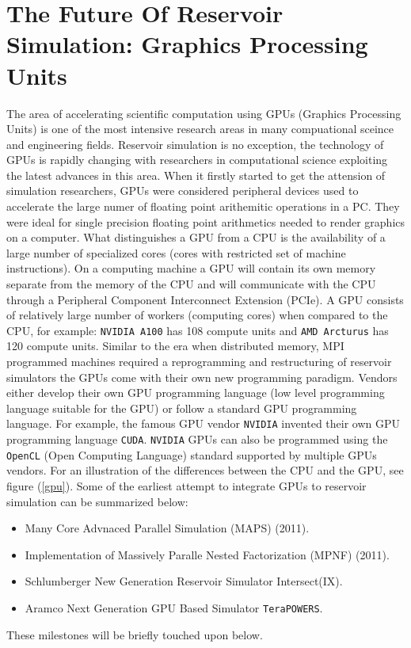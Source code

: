\documentclass[barcolor=BrickRed,nocopyright,nolists]{asmejour}
\begin{document}
\section{The Future Of Reservoir Simulation: Graphics Processing Units}
The area of accelerating scientific computation using GPUs (Graphics Processing Units)  is one of the most intensive research areas in many compuational sceince and engineering fields. Reservoir simulation is no exception, the technology of GPUs is rapidly changing with researchers in computational science exploiting the latest advances in this area.
When it firstly started to get the attension of simulation researchers, GPUs were considered peripheral devices used to accelerate the large numer of floating point arithemitic operations in a PC. They were ideal for single precision floating point arithmetics needed to render graphics on a computer. What distinguishes a GPU from a CPU is the availability 
of a large number of specialized cores (cores with restricted set of machine instructions). On a computing machine a GPU will contain its own memory separate from the memory of the CPU and will communicate with the CPU through a Peripheral Component Interconnect Extension (PCIe)\cite{rz}. A GPU consists of relatively large number of workers (computing cores)
when compared to the CPU, for example: \texttt{NVIDIA A100} has 108 compute units and \texttt{AMD Arcturus} has 120 compute units. Similar to the era when distributed memory, MPI programmed machines required a reprogramming and restructuring of reservoir simulators the GPUs come with their own new programming paradigm. Vendors either develop their own GPU
programming language (low level programming language suitable for the GPU) or follow a standard GPU programming language. For example, the famous GPU vendor \texttt{NVIDIA} invented their own GPU programming language \texttt{CUDA}. \texttt{NVIDIA} GPUs can also be programmed using the \texttt{OpenCL} (Open Computing Language) standard
supported by multiple GPUs vendors. For an illustration of the differences between the CPU and the GPU, see figure (\ref{gpu}).
Some of the earliest attempt to integrate GPUs to reservoir simulation can be summarized below:

\begin{itemize}
	\item Many Core Advnaced Parallel Simulation (MAPS) (2011)\cite{spe141265}.
	\item Implementation of Massively Paralle Nested Factorization (MPNF) (2011)\cite{spe141402}.
	\item Schlumberger New Generation Reservoir Simulator Intersect(IX)\cite{spe93274}.
	\item Aramco Next Generation GPU Based Simulator \texttt{TeraPOWERS}\cite{spe203918}.
\end{itemize}
These milestones will be briefly touched upon below.
\end{document}
